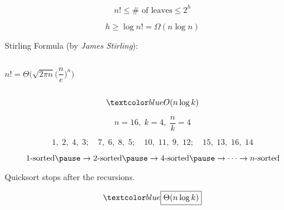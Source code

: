 \begin{frame}{}
  \begin{center}
    {\Large {}} 
  \end{center}

  \[
    \boxed{n! \le \# \text{ of leaves} \le 2^h}
  \]

  \pause
  \[
    h \ge \log n! = \Omega(n \log n)
  \]

  \pause
  \vspace{0.60cm}
  \begin{alertblock}{Stirling Formula (by {\it James Stirling}):}
    \begin{columns}
	\[
	  n! = \Theta\Big(\sqrt{2 \pi n} \Big(\frac{n}{e}\Big)^{n}\Big)
	\]
    \end{columns}
  \end{alertblock}
\end{frame}

\begin{frame}{}
  \begin{definition}

	\pause
    \vspace{-0.50cm}
	\[
	  \blue{O(n \log k)}
	\]
  \end{definition}

  \pause
  \[
    n = 16,\; k = 4,\; \frac{n}{k} = 4
  \]

  \[
    1,\;2,\;4,\;3;\quad 7,\;6,\;8,\;5;\quad 10,\;11,\;9,\;12;\quad 15,\;13,\;16,\;14
  \]
\end{frame}

\begin{frame}{}
  \begin{center}
	{}
  \end{center}

  \pause
  \[
    1\text{-sorted} \pause \to 2\text{-sorted} \pause \to 4\text{-sorted} \pause \to \cdots \to n\text{-sorted}
  \]

  \pause
  \centerline{Quicksort  stops after the  recursions.}

  \pause
  \vspace{0.50cm}
  \[
    \blue{\boxed{\Theta(n \log k)}}
  \]
\end{frame}

